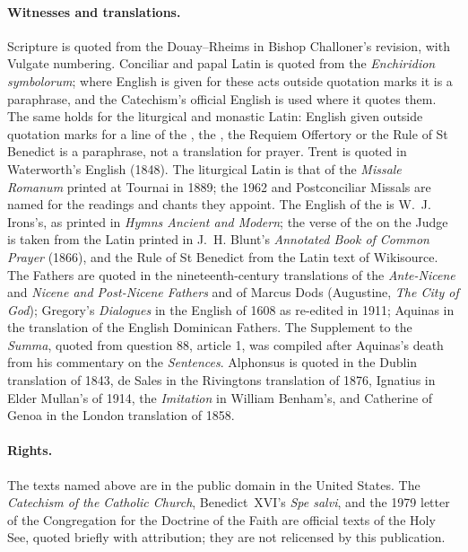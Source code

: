 \paragraph{Witnesses and translations.} Scripture is quoted from the Douay--Rheims in Bishop Challoner's revision, with Vulgate numbering. Conciliar and papal Latin is quoted from the \emph{Enchiridion symbolorum}; where English is given for these acts outside quotation marks it is a paraphrase, and the Catechism's official English is used where it quotes them. The same holds for the liturgical and monastic Latin: English given outside quotation marks for a line of the , the , the Requiem Offertory or the Rule of St Benedict is a paraphrase, not a translation for prayer. Trent is quoted in Waterworth's English (1848). The liturgical Latin is that of the \emph{Missale Romanum} printed at Tournai in 1889; the 1962 and Postconciliar Missals are named for the readings and chants they appoint. The English of the  is W.~J. Irons's, as printed in \emph{Hymns Ancient and Modern}; the verse of the  on the Judge is taken from the Latin printed in J.~H. Blunt's \emph{Annotated Book of Common Prayer} (1866), and the Rule of St Benedict from the Latin text of Wikisource. The Fathers are quoted in the nineteenth-century translations of the \emph{Ante-Nicene} and \emph{Nicene and Post-Nicene Fathers} and of Marcus Dods (Augustine, \emph{The City of God}); Gregory's \emph{Dialogues} in the English of 1608 as re-edited in 1911; Aquinas in the translation of the English Dominican Fathers. The Supplement to the \emph{Summa}, quoted from question 88, article 1, was compiled after Aquinas's death from his commentary on the \emph{Sentences}. Alphonsus is quoted in the Dublin translation of 1843, de Sales in the Rivingtons translation of 1876, Ignatius in Elder Mullan's of 1914, the \emph{Imitation} in William Benham's, and Catherine of Genoa in the London translation of 1858.

\paragraph{Rights.} The texts named above are in the public domain in the United States. The \emph{Catechism of the Catholic Church}, Benedict~XVI's \emph{Spe salvi}, and the 1979 letter of the Congregation for the Doctrine of the Faith are official texts of the Holy See, quoted briefly with attribution; they are not relicensed by this publication.

